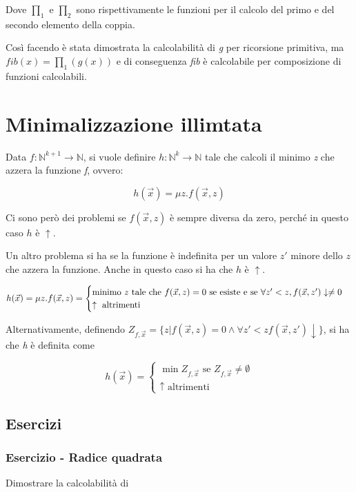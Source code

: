Dove $\prod_1$ e $\prod_2$ sono rispettivamente le funzioni per il calcolo del primo e del secondo elemento della coppia.

Così facendo è stata dimostrata la calcolabilità di \textit{g} per ricorsione primitiva, ma $fib(x) = \prod_1(g(x))$ e di conseguenza \textit{fib} è calcolabile per composizione di funzioni calcolabili.

\section{Minimalizzazione illimtata}

Data $ f : \mathbb{N}^{k+1} \rightarrow \mathbb{N} $, si vuole definire $ h : \mathbb{N}^k \rightarrow \mathbb{N} $ tale che calcoli il minimo \textit{z} che azzera la funzione \textit{f}, ovvero:

$$
h(\vec{x}) = \mu z.f(\vec{x},z)
$$

Ci sono però dei problemi se $ f(\vec{x}, z) $ è sempre diversa da zero, perché in questo caso $ h $ è $ \uparrow $.

Un altro problema si ha se la funzione è indefinita per un valore $ z' $ minore dello $ z $ che azzera la funzione. Anche in questo caso si ha che $ h $ è $ \uparrow $.

$$
h(\vec{x}) = \mu z.f(\vec{x},z) = \begin{cases}
\text{minimo \textit{z} tale che } f(\vec{x},z) = 0 \text{ se esiste e se } \forall z' < z, f(\vec{x},z')\downarrow \neq 0 \\
\uparrow \text{ altrimenti}
\end{cases}
$$

Alternativamente, definendo $ Z_{f, \vec{x}} = \{z | f(\vec{x},z) = 0 \wedge \forall z' < z f(\vec{x},z') \downarrow \} $, si ha che \textit{h} è definita come

$$
h(\vec{x}) = \begin{cases}
\min Z_{f,\vec{x}} \text{ se } Z_{f,\vec{x}} \neq \emptyset \\
\uparrow \text{ altrimenti}
\end{cases}
$$

\subsection{Esercizi}

\subsubsection{Esercizio - Radice quadrata}
Dimostrare la calcolabilità di 

